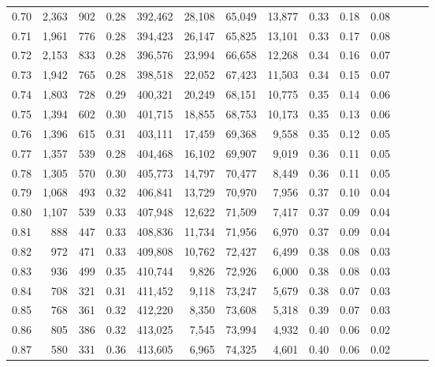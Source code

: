 \begin{tabular}{rrrrrrrrrrrrrr}
0.70 &   2,363 &    902 &  0.28 &  392,462 &   28,108 &  65,049 &  13,877 &  0.33 &  0.18 &      0.08 \\
0.71 &   1,961 &    776 &  0.28 &  394,423 &   26,147 &  65,825 &  13,101 &  0.33 &  0.17 &      0.08 \\
0.72 &   2,153 &    833 &  0.28 &  396,576 &   23,994 &  66,658 &  12,268 &  0.34 &  0.16 &      0.07 \\
0.73 &   1,942 &    765 &  0.28 &  398,518 &   22,052 &  67,423 &  11,503 &  0.34 &  0.15 &      0.07 \\
0.74 &   1,803 &    728 &  0.29 &  400,321 &   20,249 &  68,151 &  10,775 &  0.35 &  0.14 &      0.06 \\
0.75 &   1,394 &    602 &  0.30 &  401,715 &   18,855 &  68,753 &  10,173 &  0.35 &  0.13 &      0.06 \\
0.76 &   1,396 &    615 &  0.31 &  403,111 &   17,459 &  69,368 &   9,558 &  0.35 &  0.12 &      0.05 \\
0.77 &   1,357 &    539 &  0.28 &  404,468 &   16,102 &  69,907 &   9,019 &  0.36 &  0.11 &      0.05 \\
0.78 &   1,305 &    570 &  0.30 &  405,773 &   14,797 &  70,477 &   8,449 &  0.36 &  0.11 &      0.05 \\
0.79 &   1,068 &    493 &  0.32 &  406,841 &   13,729 &  70,970 &   7,956 &  0.37 &  0.10 &      0.04 \\
0.80 &   1,107 &    539 &  0.33 &  407,948 &   12,622 &  71,509 &   7,417 &  0.37 &  0.09 &      0.04 \\
0.81 &     888 &    447 &  0.33 &  408,836 &   11,734 &  71,956 &   6,970 &  0.37 &  0.09 &      0.04 \\
0.82 &     972 &    471 &  0.33 &  409,808 &   10,762 &  72,427 &   6,499 &  0.38 &  0.08 &      0.03 \\
0.83 &     936 &    499 &  0.35 &  410,744 &    9,826 &  72,926 &   6,000 &  0.38 &  0.08 &      0.03 \\
0.84 &     708 &    321 &  0.31 &  411,452 &    9,118 &  73,247 &   5,679 &  0.38 &  0.07 &      0.03 \\
0.85 &     768 &    361 &  0.32 &  412,220 &    8,350 &  73,608 &   5,318 &  0.39 &  0.07 &      0.03 \\
0.86 &     805 &    386 &  0.32 &  413,025 &    7,545 &  73,994 &   4,932 &  0.40 &  0.06 &      0.02 \\
0.87 &     580 &    331 &  0.36 &  413,605 &    6,965 &  74,325 &   4,601 &  0.40 &  0.06 &      0.02 \\

\end{tabular}
